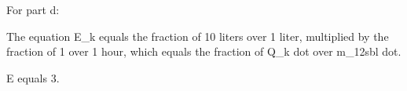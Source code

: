 For part d:

The equation E_k equals the fraction of 10 liters over 1 liter, multiplied by the fraction of 1 over 1 hour, which equals the fraction of Q_k dot over m_12sbl dot.

E equals 3.